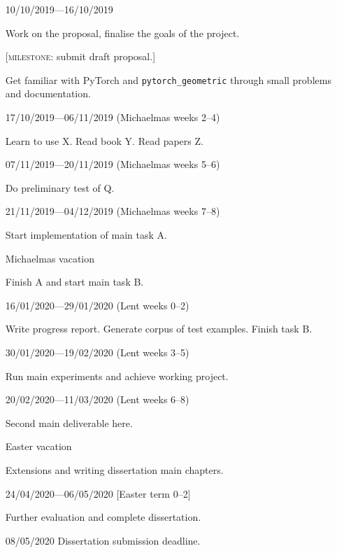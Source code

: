 \documentclass[12pt,a4paper,twoside]{article}
\begin{document}
\begin{enumerate}[leftmargin=*, align=left, font=\bfseries]
\item[10/10/2019—16/10/2019] \hfill \smallskip

Work on the proposal, finalise the goals of the project.

[\textsc{milestone}: submit draft proposal.]

Get familiar with PyTorch and \texttt{pytorch\_geometric} through small problems and documentation.


\item[17/10/2019—06/11/2019] (Michaelmas weeks 2--4) \hfill \smallskip 

Learn to use X. Read book Y. Read papers Z.

\item[07/11/2019—20/11/2019] (Michaelmas weeks 5--6) \hfill \smallskip
 
Do preliminary test of Q.

\item[21/11/2019—04/12/2019] (Michaelmas weeks 7--8) \hfill \smallskip
 
Start implementation of main task A.

\item[Michaelmas vacation] \hfill \smallskip

Finish A and start main task B.

\item[16/01/2020—29/01/2020] (Lent weeks 0--2) \hfill \smallskip
 
Write progress report. Generate corpus of
  test examples. Finish task B.

\item[30/01/2020—19/02/2020] (Lent weeks 3--5) \hfill \smallskip

Run main experiments and achieve working project.

\item[20/02/2020—11/03/2020] (Lent weeks 6--8) \hfill \smallskip

Second main deliverable here.

\item[Easter vacation] \hfill \smallskip

Extensions and writing dissertation main
  chapters.

\item[24/04/2020—06/05/2020] [Easter term 0--2]  \hfill \smallskip

Further evaluation and complete dissertation.

\item[08/05/2020] Dissertation submission deadline.

\end{enumerate}



\end{document}
